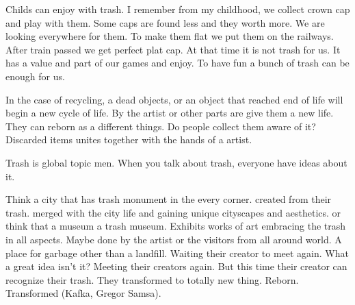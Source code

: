 \documentclass[12pt]{article}
\begin{document}
\begin{itemize}

\end{itemize}

Childs can enjoy with trash. I remember from my childhood, we collect crown cap and play with them. Some caps are found less and they worth more. We are looking everywhere for them. To make them flat we put them on the railways. After train passed we get perfect plat cap. At that time it is not trash for us. It has a value and part of our games and enjoy. To have fun a bunch of trash can be enough for us.

In the case of recycling, a dead objects, or an object that reached end of life will begin a new cycle of life. By the artist or other parts are give them a new life. They can reborn as a different things. Do people collect them aware of it? Discarded items unites together with the hands of a artist. 

Trash is global topic men. When you talk about trash, everyone have ideas about it. 

Think a city that has trash monument in the every corner. created from their trash. merged with the city life and gaining unique cityscapes and aesthetics. or think that a museum a trash museum. Exhibits works of art embracing the trash in all aspects. Maybe done by the artist or the visitors from all around world. A place for garbage other than a landfill. Waiting their creator to meet again. What a great idea isn't it? Meeting their creators again. But this time their creator can recognize their trash. They transformed to totally new thing. Reborn. Transformed (Kafka, Gregor Samsa).
\end{document}

